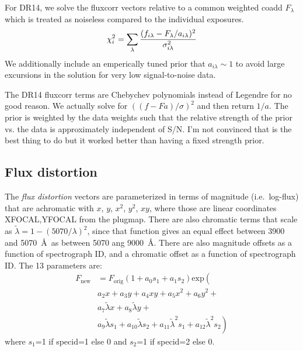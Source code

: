\documentclass[12pt]{article}
\begin{document}
For DR14, we solve the fluxcorr vectors relative to a common weighted coadd $F_\lambda$ which is treated as noiseless compared to the individual exposures.
\begin{equation}
    \chi^2_i = \sum_\lambda {
        (f_{i\lambda} - F_\lambda / a_{i\lambda})^2 \over
        \sigma_{i\lambda}^2
        }
\end{equation}
We additionally include an emperically tuned prior that $a_{i\lambda} \sim 1$ to avoid large excursions in the solution for very low signal-to-noise data.

 The DR14 fluxcorr terms are Chebychev polynomials instead of Legendre for no
 good reason.  We actually solve for $((f - F a)/\sigma)^2$ and then return $1/a$.
 The prior is weighted by the data weights such that the relative strength of
 the prior vs. the data is approximately independent of S/N.  I'm not convinced
 that is the best thing to do but it worked better than having a fixed
 strength prior.


\subsection{Flux distortion}

The {\it flux distortion} vectors are parameterized in terms of magnitude
(i.e.~log-flux) that are achromatic with $x$, $y$, $x^2$, $y^2$, $xy$,
where those are linear coordinates XFOCAL,YFOCAL from the plugmap.
There are also chromatic terms that scale as
$\tilde \lambda = 1-(5070/\lambda)^2$,
since that function gives an equal effect between 3900 and 5070~\AA\
as between 5070 ang 9000~\AA.
There are also magnitude offsets as a function of spectrograph ID,
and a chromatic offset as a function of spectrograph ID.  The 13 parameters are:
\begin{equation}
\begin{split}
    F_\mathrm{new} &= F_\mathrm{orig}
        \left(1 + a_0 s_1 + a_1 s_2 \right) \mathrm{exp} \left( \right. \\
&            a_2 x + a_3 y + a_4 x y + a_5 x^2 + a_6 y^2 + \\
&            a_7 \tilde \lambda x + a_8 \tilde \lambda y + \\
&             a_9 \tilde \lambda s_1 + a_{10} \tilde \lambda s_2 +
             a_{11} \tilde \lambda^2 s_1 + a_{12} \tilde \lambda^2 s_2
        \left. \right)
\end{split}
\end{equation}
where $s_1$=1 if specid=1 else 0 and $s_2$=1 if specid=2 else 0.
\end{document}
